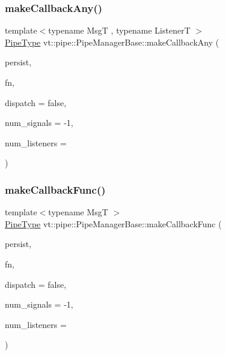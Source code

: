 \subsubsection{\texorpdfstring{make\+Callback\+Any()}{makeCallbackAny()}}
{\footnotesize\ttfamily template$<$typename MsgT , typename ListenerT $>$ \\
\hyperlink{namespacevt_ac9852acda74d1896f48f406cd72c7bd3}{Pipe\+Type} vt\+::pipe\+::\+Pipe\+Manager\+Base\+::make\+Callback\+Any (\begin{DoxyParamCaption}\item[{bool const \&}]{persist,  }\item[{ListenerT \&\&}]{fn,  }\item[{bool const \&}]{dispatch = {\ttfamily false},  }\item[{\hyperlink{namespacevt_a9b39ce9494bb04674d0d5b895a5aa50f}{Ref\+Type}}]{num\+\_\+signals = {\ttfamily -\/1},  }\item[{\hyperlink{namespacevt_a9b39ce9494bb04674d0d5b895a5aa50f}{Ref\+Type}}]{num\+\_\+listeners = {} }\end{DoxyParamCaption})\hspace{0.3cm}{\ttfamily [protected]}}

\mbox{\label{structvt_1_1pipe_1_1_pipe_manager_base_a7fbd6f5b88e5cca79f8588ea67ce6161}} 
\subsubsection{\texorpdfstring{make\+Callback\+Func()}{makeCallbackFunc()}}
{\footnotesize\ttfamily template$<$typename MsgT $>$ \\
\hyperlink{namespacevt_ac9852acda74d1896f48f406cd72c7bd3}{Pipe\+Type} vt\+::pipe\+::\+Pipe\+Manager\+Base\+::make\+Callback\+Func (\begin{DoxyParamCaption}\item[{bool const \&}]{persist,  }\item[{\hyperlink{structvt_1_1pipe_1_1_pipe_manager_base_aa54eee64ab32a27777a672d49eb861f4}{Func\+Msg\+Type}$<$ MsgT $>$}]{fn,  }\item[{bool const \&}]{dispatch = {\ttfamily false},  }\item[{\hyperlink{namespacevt_a9b39ce9494bb04674d0d5b895a5aa50f}{Ref\+Type}}]{num\+\_\+signals = {\ttfamily -\/1},  }\item[{\hyperlink{namespacevt_a9b39ce9494bb04674d0d5b895a5aa50f}{Ref\+Type}}]{num\+\_\+listeners = {} }\end{DoxyParamCaption})}

